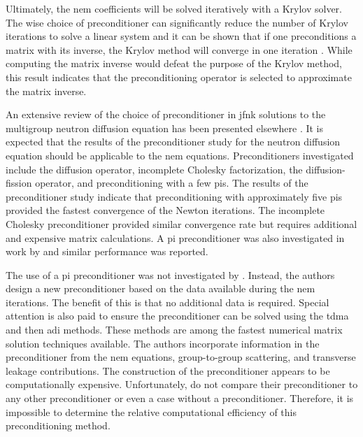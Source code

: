       Ultimately, the \gls{nem} coefficients will be solved iteratively with a
      Krylov solver. The wise choice of preconditioner can significantly reduce 
      the number of Krylov iterations to solve a linear system and it can be
      shown that if one preconditions a matrix with its inverse, the Krylov
      method will converge in one iteration \cite{textbookkelley}. While
      computing the matrix inverse would defeat the purpose of the Krylov
      method, this result indicates that the preconditioning operator is
      selected to approximate the matrix inverse.

      An extensive review of the choice of preconditioner in \gls{jfnk}
      solutions to the multigroup neutron diffusion equation has been presented
      elsewhere \cite{gill_azmy}. It is expected that the results of the
      preconditioner study for the neutron diffusion equation should be
      applicable to the \gls{nem} equations. Preconditioners investigated
      include the diffusion operator, incomplete Cholesky factorization, the
      diffusion-fission operator, and preconditioning with a few \glspl{pi}.
      The results of the preconditioner study indicate that preconditioning with
      approximately five \glspl{pi} provided the fastest convergence of the
      Newton iterations. The incomplete Cholesky preconditioner provided similar
      convergence rate but requires additional and expensive matrix
      calculations. A \gls{pi} preconditioner was also investigated in work by
      \citeauthor{jfnk_wielandt} and similar performance was reported.

      The use of a \gls{pi} preconditioner was not investigated by
      \citeauthor{qe2paper}. Instead, the authors design a new
      preconditioner based on the data available during the \gls{nem}
      iterations. The benefit of this is that no additional data is required.
      Special attention is also paid to ensure the preconditioner can be solved
      using the \gls{tdma} and then \gls{adi} methods. These methods are among
      the fastest numerical matrix solution techniques available. The authors
      incorporate information in the preconditioner from the \gls{nem}
      equations, group-to-group scattering, and transverse leakage
      contributions. The construction of the preconditioner appears to be 
      computationally expensive. Unfortunately, \citeauthor{qe2paper} do not
      compare their preconditioner to any other preconditioner or even a case
      without a preconditioner. Therefore, it is impossible to determine the
      relative computational efficiency of this preconditioning method.

